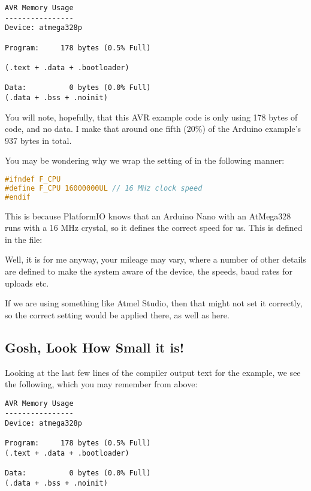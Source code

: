 \begin{lstlisting}[numbers={none},caption={AVR Blink Memory Usage}]
AVR Memory Usage
----------------
Device: atmega328p

Program:     178 bytes (0.5% Full)

(.text + .data + .bootloader)

Data:          0 bytes (0.0% Full)
(.data + .bss + .noinit)\end{lstlisting}

You will note, hopefully, that this AVR example code is only using 178 bytes of code, and no data. I make that around one fifth (20\%) of the Arduino example's 937 bytes in total.

You may be wondering why we wrap the setting of  in the following manner:

\begin{lstlisting}[language=C,firstnumber=2,caption={Wrapping F\_CPU in AVRBlink.c}]
#ifndef F_CPU
#define F_CPU 16000000UL // 16 MHz clock speed
#endif
\end{lstlisting}

This is because PlatformIO knows that an Arduino Nano with an AtMega328 runs with a 16
MHz crystal, so it defines the correct speed for us. This is defined in the file:


Well, it is for me anyway, your mileage may vary, where a number of other details are defined to make the system aware of the device, the speeds, baud rates for uploads etc.

If we are using something like Atmel Studio, then that might not set it correctly, so the correct setting would be applied there, as well as here.

\subsection{Gosh, Look How Small it
is!}\label{gosh-look-how-small-it-is}

Looking at the last few lines of the compiler output text for the  example, we see the following, which you may remember from above:

\begin{lstlisting}[firstnumber=14]
AVR Memory Usage
----------------
Device: atmega328p

Program:     178 bytes (0.5% Full)
(.text + .data + .bootloader)

Data:          0 bytes (0.0% Full)
(.data + .bss + .noinit)
\end{lstlisting}

